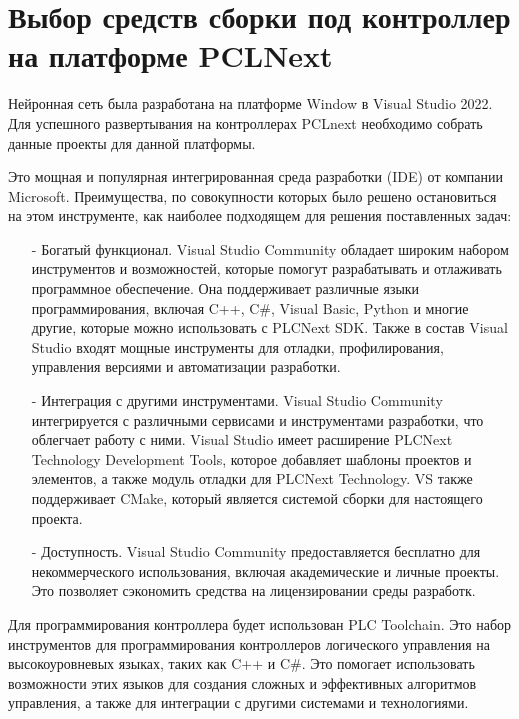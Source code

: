 \section{Выбор средств сборки под контроллер на платформе PCLNext}

Нейронная сеть была разработана на платформе Window в Visual Studio 2022. Для успешного развертывания на контроллерах PCLnext необходимо собрать данные проекты для данной платформы.
	
Это мощная и популярная интегрированная среда разработки (IDE) от компании Microsoft. Преимущества, по совокупности которых было решено остановиться на этом инструменте, как наиболее подходящем для решения поставленных задач:

\begin{itemize}

    \item[-] Богатый функционал. Visual Studio Community обладает широким набором инструментов и возможностей, которые помогут разрабатывать и отлаживать программное обеспечение. Она поддерживает различные языки программирования, включая C++, C\#, Visual Basic, Python и многие другие, которые можно использовать с PLCNext SDK. Также в состав Visual Studio входят мощные инструменты для отладки, профилирования, управления версиями и автоматизации разработки.

    \item[-] Интеграция с другими инструментами. Visual Studio Community интегрируется с различными сервисами и инструментами разработки, что облегчает работу с ними. Visual Studio имеет расширение PLCNext Technology Development Tools, которое добавляет шаблоны проектов и элементов, а также модуль отладки для PLCNext Technology. VS также поддерживает CMake, который является системой сборки для настоящего проекта.
    
    \item[-] Доступность. Visual Studio Community предоставляется бесплатно для некоммерческого использования, включая академические и личные проекты. Это позволяет сэкономить средства на лицензировании среды разработк.

\end{itemize} 	

Для программирования контроллера будет использован PLC Toolchain. Это набор инструментов для программирования контроллеров логического управления на высокоуровневых языках, таких как C++ и C\#. Это помогает использовать возможности этих языков для создания сложных и эффективных алгоритмов управления, а также для интеграции с другими системами и технологиями.

